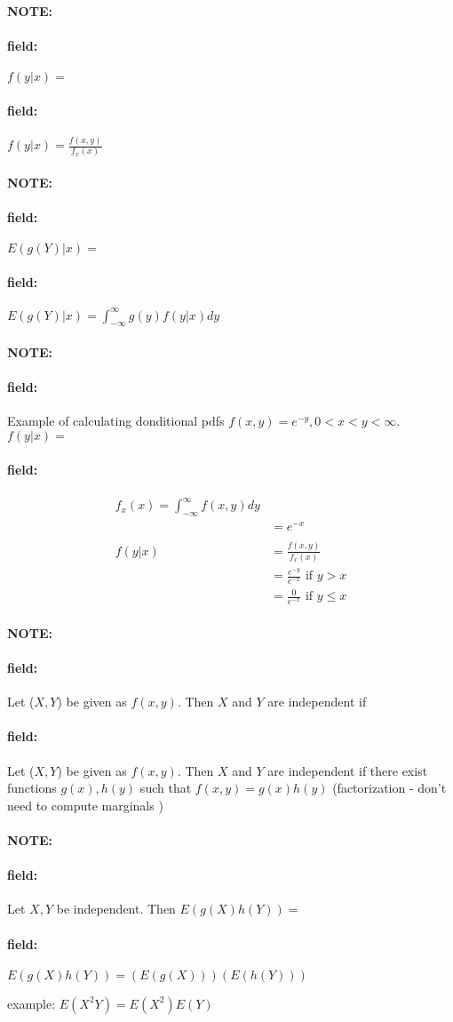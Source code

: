 \documentclass[12pt]{article}
\newenvironment{note}{\paragraph{NOTE:}}{}
\newenvironment{field}{\paragraph{field:}}{}
\begin{document}

\begin{note}
  \begin{field}
    $f(y|x) = $
  \end{field}
  \begin{field}
    $f(y|x) = \frac{f(x,y)}{f_x(x)}$
  \end{field}
\end{note}

\begin{note}
  \begin{field}
    $E(g(Y)|x) = $
  \end{field}
  \begin{field}
    $E(g(Y)|x) = \int_{-\infty}^\infty g(y)f(y|x) dy $
  \end{field}
\end{note}

\begin{note}
  \begin{field}
    Example of calculating donditional pdfs
$f(x,y) = e^{-y}, 0 < x < y < \infty$. $f(y|x) = $

  \end{field}
  \begin{field}
    \begin{align*}
      f_x(x) = \int_{-\infty}^\infty f(x,y) dy \\
      &= e^{-x}\\
      \\
      f(y|x) &= \frac{f(x,y)}{f_x(x)}\\
      &= \frac{e^{-y}}{e^{-x}} \text{ if } y > x\\
      &= \frac{0}{e^{-x}} \text{ if } y \leq x
    \end{align*}
  \end{field}
\end{note}


\begin{note}
  \begin{field}
    Let ($X,Y$) be given as $f(x,y)$. Then $X$ and $Y$ are independent if
  \end{field}
  \begin{field}
    Let ($X,Y$) be given as $f(x,y)$. Then $X$ and $Y$ are independent if there exist functions $g(x), h(y)$ such that $f(x,y) = g(x)h(y)$ (factorization - don't need to compute marginals )
  \end{field}
\end{note}

\begin{note}
  \begin{field}
    Let $X,Y$ be independent. Then $E(g(X)h(Y)) = $
  \end{field}
  \begin{field}
    $E(g(X)h(Y)) = (E(g(X)))(E(h(Y)))$

    example: $E(X^2Y) = E(X^2)E(Y)$
  \end{field}
\end{note}
\end{document}
